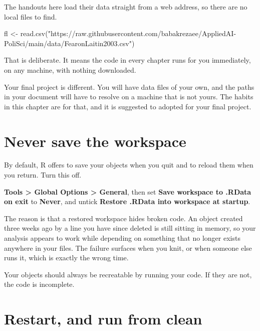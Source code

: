\documentclass[
  a4paper,
]{scrbook}
\newenvironment{Shaded}{\begin{snugshade}}{\end{snugshade}}
\newcommand{\FunctionTok}[1]{\textcolor[rgb]{0.28,0.35,0.67}{#1}}
\newcommand{\NormalTok}[1]{\textcolor[rgb]{0.00,0.23,0.31}{#1}}
\newcommand{\OtherTok}[1]{\textcolor[rgb]{0.00,0.23,0.31}{#1}}
\newcommand{\StringTok}[1]{\textcolor[rgb]{0.13,0.47,0.30}{#1}}
\begin{document}

The handouts here load their data straight from a web address, so there
are no local files to find.

\begin{Shaded}
\begin{Highlighting}[]
\NormalTok{fl }\OtherTok{\textless{}{-}} \FunctionTok{read.csv}\NormalTok{(}\StringTok{"https://raw.githubusercontent.com/babakrezaee/AppliedAI{-}PoliSci/main/data/FearonLaitin2003.csv"}\NormalTok{)}
\end{Highlighting}
\end{Shaded}

That is deliberate. It means the code in every chapter runs for you
immediately, on any machine, with nothing downloaded.

Your final project is different. You will have data files of your own,
and the paths in your document will have to resolve on a machine that is
not yours. The habits in this chapter are for that, and it is suggested
to adopted for your final project.

\section*{Never save the workspace}\label{never-save-the-workspace}


By default, R offers to save your objects when you quit and to reload
them when you return. Turn this off.

\textbf{Tools \textgreater{} Global Options \textgreater{} General},
then set \textbf{Save workspace to .RData on exit} to \textbf{Never},
and untick \textbf{Restore .RData into workspace at startup}.

The reason is that a restored workspace hides broken code. An object
created three weeks ago by a line you have since deleted is still
sitting in memory, so your analysis appears to work while depending on
something that no longer exists anywhere in your files. The failure
surfaces when you knit, or when someone else runs it, which is exactly
the wrong time.

Your objects should always be recreatable by running your code. If they
are not, the code is incomplete.

\section*{Restart, and run from clean}\label{restart-and-run-from-clean}
\end{document}
